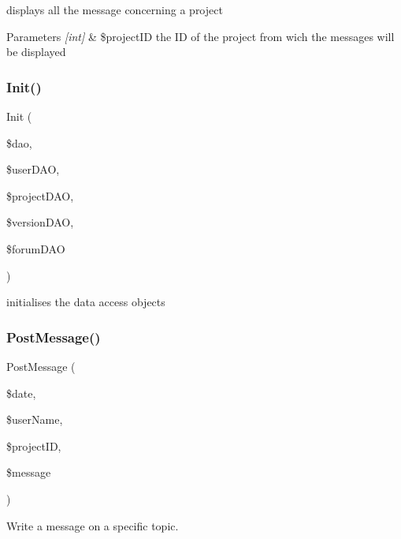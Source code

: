 displays all the message concerning a project 


\begin{DoxyParams}{Parameters}
{\em \mbox{[}int\mbox{]}} & \$project\+ID the ID of the project from wich the messages will be displayed \\
\hline
\end{DoxyParams}
\mbox{\label{class_forum_controller_a4b9462f290a447541323a8a21484c193}} 
\subsubsection{\texorpdfstring{Init()}{Init()}}
{\footnotesize\ttfamily Init (\begin{DoxyParamCaption}\item[{}]{\$dao,  }\item[{}]{\$user\+D\+AO,  }\item[{}]{\$project\+D\+AO,  }\item[{}]{\$version\+D\+AO,  }\item[{}]{\$forum\+D\+AO }\end{DoxyParamCaption})}



initialises the data access objects 

\mbox{\label{class_forum_controller_a6aa6340089c9cbf1d660ede98e40a89f}} 
\subsubsection{\texorpdfstring{Post\+Message()}{PostMessage()}}
{\footnotesize\ttfamily Post\+Message (\begin{DoxyParamCaption}\item[{}]{\$date,  }\item[{}]{\$user\+Name,  }\item[{}]{\$project\+ID,  }\item[{}]{\$message }\end{DoxyParamCaption})}



Write a message on a specific topic. 


